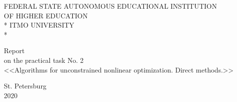 \newpage
\begin{titlepage}

\begin{center}\large{
    FEDERAL STATE AUTONOMOUS EDUCATIONAL INSTITUTION \\
    OF HIGHER EDUCATION \\*
    ITMO UNIVERSITY \\*
}\end{center}

\vspace{12em}

\begin{center}\large{
    Report \\
    on the practical task No. 2 \\
    <<Algorithms for unconstrained nonlinear optimization. Direct methods.>>
}\end{center}

\vspace{8.5em}

\vspace{1.5em}

\vspace{\fill}

\begin{center}
    St. Petersburg \\
    2020
\end{center}

\end{titlepage}
